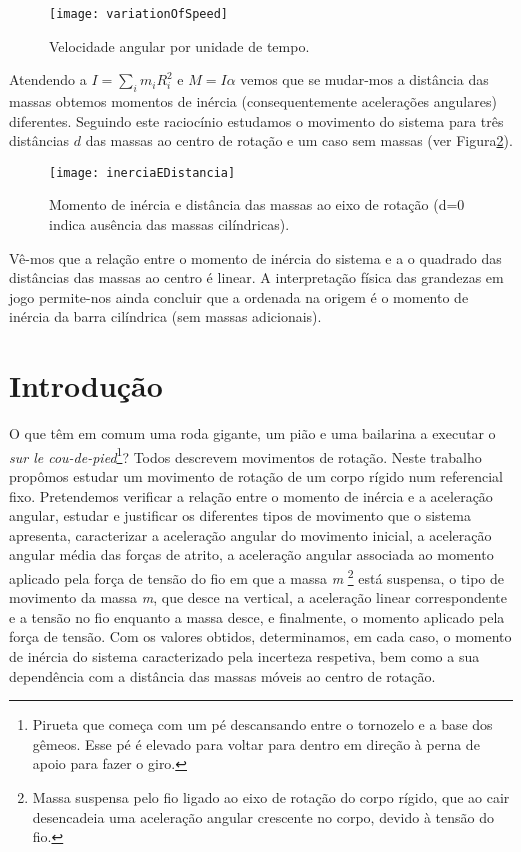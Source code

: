 \documentclass[11pt]{report}
\begin{document}
\begin{figure} [h]
\center
\texttt{[image: variationOfSpeed]}
\caption{Velocidade angular por unidade de tempo. \label{fig:figura2}}
\end{figure}

Atendendo a $I=\sum_im_iR_i^2$ e $M=I\alpha $ vemos que se mudar-mos a distância das massas obtemos momentos de inércia (consequentemente acelerações angulares) diferentes. Seguindo este raciocínio estudamos o movimento do sistema para três distâncias $d$ das massas ao centro de rotação e um caso sem massas (ver Figura\ref{fig:figura3}).

\begin{figure} [h]
\center
\texttt{[image: inerciaEDistancia]}
\caption{Momento de inércia e distância das massas ao eixo de rotação (d=0 indica ausência das massas cilíndricas). \label{fig:figura3}}
\end{figure}
Vê-mos que a relação entre o momento de inércia do sistema e a o quadrado das distâncias das massas ao centro é linear. A interpretação física das grandezas em jogo permite-nos ainda concluir que a ordenada na origem é o momento de inércia da barra cilíndrica (sem massas adicionais).

\chapter{Introdução}
O que têm em comum uma roda gigante, um pião e uma bailarina a executar o \textit{sur le cou-de-pied}\footnote{Pirueta que começa com um pé descansando entre o tornozelo e a base dos gêmeos. Esse pé é elevado para voltar para dentro em direção à perna de apoio para fazer o giro.}? Todos descrevem movimentos de rotação.
Neste trabalho propômos estudar um movimento de rotação de um corpo rígido num referencial fixo. Pretendemos verificar a relação entre o momento de inércia e a aceleração angular, estudar e justificar os diferentes tipos de movimento que o sistema apresenta, caracterizar a aceleração angular do movimento inicial, a aceleração angular média das forças de atrito, a aceleração angular associada ao momento aplicado pela força de tensão do fio em que a massa \textit{m} \footnote{Massa suspensa pelo fio ligado ao eixo de rotação do corpo rígido, que ao cair desencadeia uma aceleração angular crescente no corpo, devido à tensão do fio.} está suspensa, o tipo de movimento da massa \textit{m}, que desce na vertical, a aceleração linear correspondente e a tensão no fio enquanto a massa desce, e finalmente, o momento aplicado pela força de tensão.
Com os valores obtidos, determinamos, em cada caso, o momento de inércia do sistema caracterizado pela incerteza respetiva, bem como a sua dependência com a distância das massas móveis ao centro de rotação.
\end{document}
